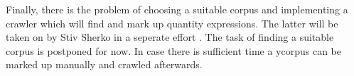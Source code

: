 \documentclass[11pt]{article}
\begin{document}
Finally, there is the problem of choosing a suitable corpus and implementing a crawler which will find and mark up quantity expressions. The latter will be taken on by Stiv Sherko in a seperate effort \cite{proposal:sharko}. The task of finding a suitable corpus is postponed for now. In case there is sufficient time a ycorpus can be marked up manually and crawled afterwards.


{}
\end{document}
